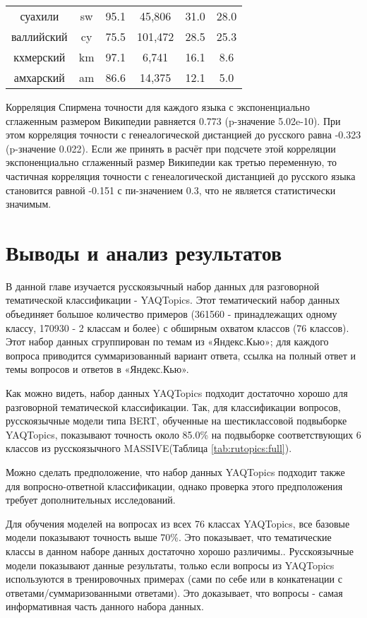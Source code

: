 {\begin{table*}
{\begin{tabular}{|c|c|c||c|c|c|}
суахили & sw & 95.1 & 45,806 & 31.0 & 28.0\\
валлийский & cy & 75.5 & 101,472 & 28.5 & 25.3\\
кхмерский & km & 97.1 & 6,741 & 16.1 & 8.6\\
амхарский & am & 86.6 & 14,375 & 12.1 & 5.0\\
\end{tabular}
}
\end{table*}
Корреляция Спирмена точности для каждого языка с экспоненциально сглаженным размером Википедии равняется 0.773 (p-значение 5.02e-10). При этом корреляция точности с генеалогической дистанцией до русского равна -0.323 (p-значение 0.022). Если же принять в расчёт при подсчете этой корреляции экспоненциально сглаженный размер Википедии как третью переменную, то частичная корреляция точности с генеалогической дистанцией до русского языка становится равной -0.151 с пи-значением 0.3, что не является статистически значимым.


\section{Выводы и анализ результатов} 

В данной главе изучается русскоязычный набор данных для разговорной тематической классификации - {YAQTopics}. Этот тематический набор данных объединяет большое количество примеров (361560 - принадлежащих одному классу, 170930 - 2 классам и более) с обширным охватом классов (76 классов). Этот набор данных сгруппирован по темам из «Яндекс.Кью»; для каждого вопроса приводится суммаризованный вариант ответа, ссылка на полный ответ и темы вопросов и ответов в «Яндекс.Кью».

Как можно видеть, набор данных {YAQTopics} подходит достаточно хорошо для разговорной тематической классификации. Так, для классификации вопросов, русскоязычные модели типа BERT, обученные на шестиклассовой подвыборке {YAQTopics}, показывают точность около 85.0\% на подвыборке соответствующих 6 классов из русскоязычного {MASSIVE}(Таблица \ref{tab:rutopics:full}).

Можно сделать предположение, что набор данных {YAQTopics} подходит также для вопросно-ответной классификации, однако проверка этого предположения требует дополнительных исследований.

Для обучения моделей на вопросах из всех 76 классах {YAQTopics}, все базовые модели показывают точность выше 70\%. Это показывает, что тематические классы в данном наборе данных достаточно хорошо различимы..
Русскоязычные модели показывают данные результаты, только если вопросы из  {YAQTopics} используются в тренировочных примерах (сами по себе или в конкатенации с ответами/суммаризованными ответами). Это доказывает, что вопросы - самая информативная часть данного набора данных.

}
